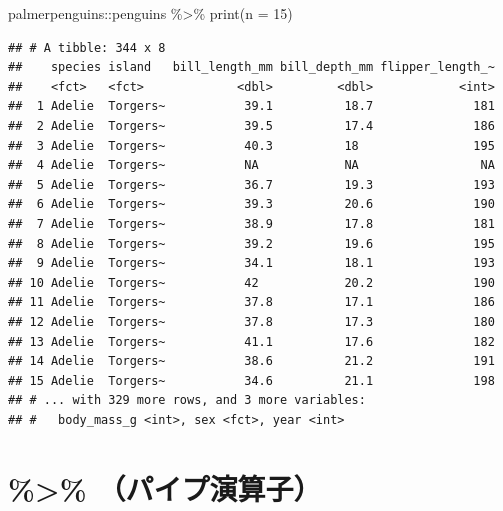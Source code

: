 \documentclass[
  xelatex,ja=standard, b5paper]{bxjsbook}
\newenvironment{Shaded}{\begin{snugshade}}{\end{snugshade}}
\newcommand{\AttributeTok}[1]{\textcolor[rgb]{0.77,0.63,0.00}{#1}}
\newcommand{\DecValTok}[1]{\textcolor[rgb]{0.00,0.00,0.81}{#1}}
\newcommand{\FunctionTok}[1]{\textcolor[rgb]{0.00,0.00,0.00}{#1}}
\newcommand{\NormalTok}[1]{#1}
\newcommand{\SpecialCharTok}[1]{\textcolor[rgb]{0.00,0.00,0.00}{#1}}
\begin{document}
\begin{Shaded}
\begin{Highlighting}[]
\NormalTok{palmerpenguins}\SpecialCharTok{::}\NormalTok{penguins }\SpecialCharTok{\%\textgreater{}\%} 
  \FunctionTok{print}\NormalTok{(}\AttributeTok{n =} \DecValTok{15}\NormalTok{)}
\end{Highlighting}
\end{Shaded}

\begin{verbatim}
## # A tibble: 344 x 8
##    species island   bill_length_mm bill_depth_mm flipper_length_~
##    <fct>   <fct>             <dbl>         <dbl>            <int>
##  1 Adelie  Torgers~           39.1          18.7              181
##  2 Adelie  Torgers~           39.5          17.4              186
##  3 Adelie  Torgers~           40.3          18                195
##  4 Adelie  Torgers~           NA            NA                 NA
##  5 Adelie  Torgers~           36.7          19.3              193
##  6 Adelie  Torgers~           39.3          20.6              190
##  7 Adelie  Torgers~           38.9          17.8              181
##  8 Adelie  Torgers~           39.2          19.6              195
##  9 Adelie  Torgers~           34.1          18.1              193
## 10 Adelie  Torgers~           42            20.2              190
## 11 Adelie  Torgers~           37.8          17.1              186
## 12 Adelie  Torgers~           37.8          17.3              180
## 13 Adelie  Torgers~           41.1          17.6              182
## 14 Adelie  Torgers~           38.6          21.2              191
## 15 Adelie  Torgers~           34.6          21.1              198
## # ... with 329 more rows, and 3 more variables:
## #   body_mass_g <int>, sex <fct>, year <int>
\end{verbatim}

\hypertarget{p-pipe}{%
\section{\%\textgreater\% （パイプ演算子）}\label{p-pipe}}
\end{document}
